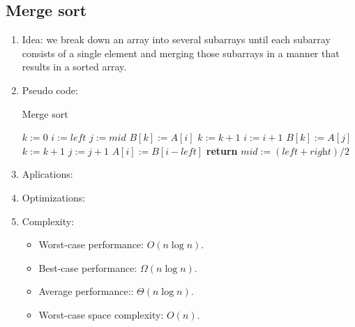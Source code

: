 \documentclass[12pt]{article}
\begin{document}
    \subsection{Merge sort}
    \begin{enumerate}
        \item Idea: we break down an array into several subarrays until each subarray consists of a single element and merging those subarrays in a manner that results in a sorted array.
        \item Pseudo code:
        \begin{algorithm}[H]
            \caption{Merge sort}
            \begin{algorithmic}[1]
                    \State $k:=0$
                    \State $i:=\textit{left}$
                    \State $j:=\textit{mid}$
                            \State $B[k]:=A[i]$
                            \State $k:=k+1$
                            \State $i:=i+1$
                        \Else
                            \State $B[k]:=A[j]$
                            \State $k:=k+1$
                            \State $j:=j+1$
                        \EndIf
                    \EndFor
                        \State $A[i]:=B[i-\textit{left}]$
                    \EndFor
                \EndFunction
                \State
                        \State \textbf{return}
                    \EndIf
                    \State $\textit{mid}:=(\textit{left}+\textit{right})/2$
                    \State {}
                    \State {}
                    \State {}
                \EndFunction
            \end{algorithmic}
        \end{algorithm}
        \item Aplications:
        \item Optimizations:
        \item Complexity:
        \begin{itemize}
            \item Worst-case performance: $O(n\log n)$.
            \item Best-case performance: $\Omega(n\log n)$.
            \item Average performance:: $\Theta(n\log n)$.
            \item Worst-case space complexity: $O(n)$.
        \end{itemize}
    \end{enumerate}
\end{document}
